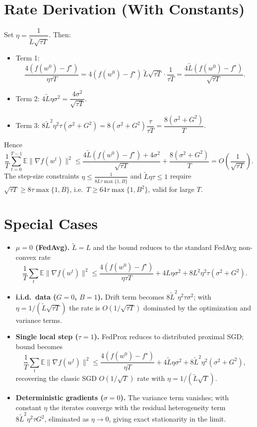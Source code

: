 \documentclass{article}
\begin{document}
\section*{Rate Derivation (With Constants)}

Set $\eta = \dfrac{1}{\tilde L\sqrt{\tau T}}$. Then:
\begin{itemize}
\item Term 1:
\[
\frac{4(f(w^0)-f^\star)}{\eta\tau T}
= 4(f(w^0)-f^\star)\,\tilde L\sqrt{\tau T}\cdot\frac{1}{\tau T}
= \frac{4\tilde L (f(w^0)-f^\star)}{\sqrt{\tau T}} .
\]
\item Term 2: $4\tilde L\eta\sigma^2 = \dfrac{4\sigma^2}{\sqrt{\tau T}}$.
\item Term 3: $8\tilde L^2\eta^2\tau(\sigma^2+G^2) = 8(\sigma^2+G^2)\dfrac{\tau}{\tau T} = \dfrac{8(\sigma^2+G^2)}{T}$.
\end{itemize}
Hence
\[
\frac{1}{T}\sum_{t=0}^{T-1}\mathbb{E}\|\nabla f(w^t)\|^2
\le \frac{4\tilde L(f(w^0)-f^\star) + 4\sigma^2}{\sqrt{\tau T}}
+ \frac{8(\sigma^2+G^2)}{T}
= O\!\left(\frac{1}{\sqrt{\tau T}}\right).
\]
The step-size constraints $\eta \le \frac{1}{8\tilde L\tau\max\{1,B\}}$ and $\tilde L\eta\tau\le 1$ require $\sqrt{\tau T}\ge 8\tau\max\{1,B\}$, i.e.\ $T \ge 64\tau\max\{1,B^2\}$, valid for large $T$.

\section*{Special Cases}

\begin{itemize}
\item \textbf{$\mu = 0$ (FedAvg).} $\tilde L = L$ and the bound reduces to the standard FedAvg non-convex rate
\[
\frac{1}{T}\sum_t \mathbb{E}\|\nabla f(w^t)\|^2 \le \frac{4(f(w^0)-f^\star)}{\eta\tau T} + 4L\eta\sigma^2 + 8L^2\eta^2\tau(\sigma^2+G^2).
\]
\item \textbf{i.i.d.\ data ($G=0$, $B=1$).} Drift term becomes $8\tilde L^2\eta^2\tau\sigma^2$; with $\eta=1/(\tilde L\sqrt{\tau T})$ the rate is $O(1/\sqrt{\tau T})$ dominated by the optimization and variance terms.
\item \textbf{Single local step ($\tau = 1$).} FedProx reduces to distributed proximal SGD; bound becomes
\[
\frac{1}{T}\sum_t\mathbb{E}\|\nabla f(w^t)\|^2 \le \frac{4(f(w^0)-f^\star)}{\eta T} + 4\tilde L\eta\sigma^2 + 8\tilde L^2\eta^2(\sigma^2+G^2),
\]
recovering the classic SGD $O(1/\sqrt{T})$ rate with $\eta = 1/(\tilde L\sqrt{T})$.
\item \textbf{Deterministic gradients ($\sigma=0$).} The variance term vanishes; with constant $\eta$ the iterates converge with the residual heterogeneity term $8\tilde L^2\eta^2\tau G^2$, eliminated as $\eta\to 0$, giving exact stationarity in the limit.
\end{itemize}
\end{document}
